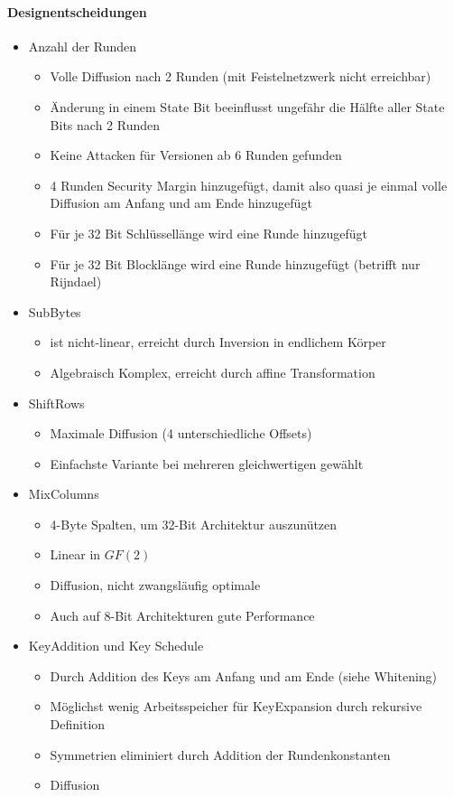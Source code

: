 \paragraph{Designentscheidungen}

\begin{itemize}
    \item Anzahl der Runden
    \begin{itemize}
        \item Volle Diffusion nach 2 Runden (mit Feistelnetzwerk nicht erreichbar)
        \item Änderung in einem State Bit beeinflusst ungefähr die Hälfte aller State Bits nach 2 Runden
        \item Keine Attacken für Versionen ab 6 Runden gefunden
        \item 4 Runden Security Margin hinzugefügt, damit also quasi je einmal volle Diffusion am Anfang und am Ende hinzugefügt
        \item Für je 32 Bit Schlüssellänge wird eine Runde hinzugefügt
        \item Für je 32 Bit Blocklänge wird eine Runde hinzugefügt (betrifft nur Rijndael)
    \end{itemize}
    \item SubBytes
    \begin{itemize}
        \item ist nicht-linear, erreicht durch Inversion in endlichem Körper
        \item Algebraisch Komplex, erreicht durch affine Transformation
    \end{itemize}
    \item ShiftRows
    \begin{itemize}
        \item Maximale Diffusion (4 unterschiedliche Offsets)
        \item Einfachste Variante bei mehreren gleichwertigen gewählt
    \end{itemize}
    \item MixColumns
    \begin{itemize}
        \item 4-Byte Spalten, um 32-Bit Architektur auszunützen
        \item Linear in $GF(2)$
        \item Diffusion, nicht zwangsläufig optimale
        \item Auch auf 8-Bit Architekturen gute Performance
    \end{itemize}
    \item KeyAddition und Key Schedule
    \begin{itemize}
        \item Durch Addition des Keys am Anfang und am Ende (siehe Whitening)
        \item Möglichst wenig Arbeitsspeicher für KeyExpansion durch rekursive Definition
        \item Symmetrien eliminiert durch Addition der Rundenkonstanten
        \item Diffusion
    \end{itemize}
\end{itemize}

